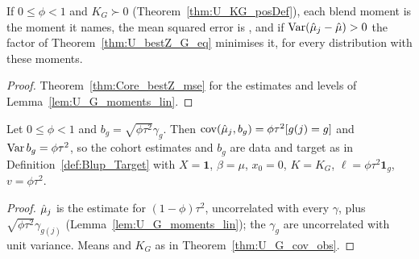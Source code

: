 \begin{theorem}\label{thm:U_G_bestZ_mse}
  \leanok
  If $0 \le \phi < 1$ and $K_G \succ 0$ (Theorem~\ref{thm:U_KG_posDef}), each
  blend moment is the moment it names, the mean squared error is , and
  if $\operatorname{Var}(\hat\mu_j - \hat\mu) > 0$ the factor of Theorem~\ref{thm:U_bestZ_G_eq}
  minimises it, for every distribution with these moments.
\end{theorem}
\begin{proof}
  \leanok
  Theorem~\ref{thm:Core_bestZ_mse} for the estimates and levels of
  Lemma~\ref{lem:U_G_moments_lin}.
\end{proof}

\begin{lemma}\label{lem:U_G_groupTarget}
  \leanok
  Let $0 \le \phi < 1$ and $b_g = \sqrt{\phi\tau^2}\gamma_g$. Then $\operatorname{cov}(\hat\mu_j, b_g) =
  \phi\tau^2[g(j) = g]$ and $\operatorname{Var} b_g = \phi\tau^2$, so the cohort estimates and $b_g$ are data
  and target as in Definition~\ref{def:Blup_Target} with $X = \mathbf 1$, $\beta = \mu$,
  $x_0 = 0$, $K = K_G$, $\ell = \phi\tau^2\mathbf 1_g$, $v = \phi\tau^2$.
\end{lemma}
\begin{proof}
  \leanok
  $\hat\mu_j$ is the estimate for $(1-\phi)\tau^2$, uncorrelated with every $\gamma$, plus
  $\sqrt{\phi\tau^2}\gamma_{g(j)}$ (Lemma~\ref{lem:U_G_moments_lin}); the $\gamma_g$ are
  uncorrelated with unit variance. Means and $K_G$ as in Theorem~\ref{thm:U_G_cov_obs}.
\end{proof}

